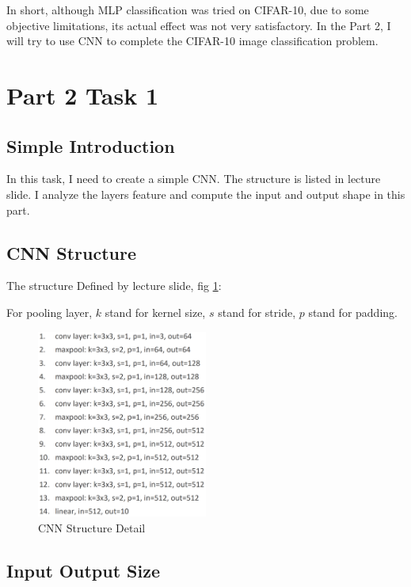 \documentclass{article}
\begin{document}
In short, although MLP classification was tried on CIFAR-10, due to some objective limitations, its actual effect was not very satisfactory. In the Part 2, I will try to use CNN to complete the CIFAR-10 image classification problem.

\section{Part 2 Task 1}

\subsection{Simple Introduction}

In this task, I need to create a simple CNN. The structure is listed in lecture slide. I analyze the layers feature and compute the input and output shape in this part.

\subsection{CNN Structure}

The structure Defined by lecture slide, fig \ref{fig:p2_cnn_structure}:

For pooling layer, $k$ stand for kernel size, $s$ stand for stride, $p$ stand for padding.

\begin{figure}[!htbp]
    \centering
    \includegraphics[width=0.5\textwidth]{img/Part2/CNN_structure.png}
    \caption{CNN Structure Detail}
    \label{fig:p2_cnn_structure}
\end{figure}

\subsection{Input Output Size}
\end{document}
